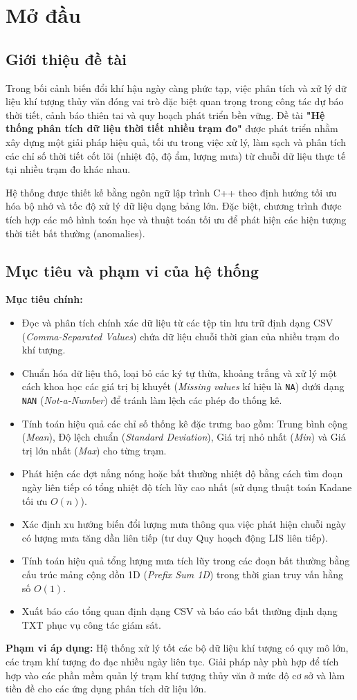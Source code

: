 \section{Mở đầu}
\subsection{Giới thiệu đề tài}
Trong bối cảnh biến đổi khí hậu ngày càng phức tạp, việc phân tích và xử lý dữ liệu khí tượng thủy văn đóng vai trò đặc biệt quan trọng trong công tác dự báo thời tiết, cảnh báo thiên tai và quy hoạch phát triển bền vững. Đề tài \textbf{"Hệ thống phân tích dữ liệu thời tiết nhiều trạm đo"} được phát triển nhằm xây dựng một giải pháp hiệu quả, tối ưu trong việc xử lý, làm sạch và phân tích các chỉ số thời tiết cốt lõi (nhiệt độ, độ ẩm, lượng mưa) từ chuỗi dữ liệu thực tế tại nhiều trạm đo khác nhau.

Hệ thống được thiết kế bằng ngôn ngữ lập trình C++ theo định hướng tối ưu hóa bộ nhớ và tốc độ xử lý dữ liệu dạng bảng lớn. Đặc biệt, chương trình được tích hợp các mô hình toán học và thuật toán tối ưu để phát hiện các hiện tượng thời tiết bất thường (anomalies).

\subsection{Mục tiêu và phạm vi của hệ thống}
\textbf{Mục tiêu chính:}
\begin{itemize}
    \item Đọc và phân tích chính xác dữ liệu từ các tệp tin lưu trữ định dạng CSV (\textit{Comma-Separated Values}) chứa dữ liệu chuỗi thời gian của nhiều trạm đo khí tượng.
    \item Chuẩn hóa dữ liệu thô, loại bỏ các ký tự thừa, khoảng trắng và xử lý một cách khoa học các giá trị bị khuyết (\textit{Missing values} kí hiệu là \texttt{NA}) dưới dạng \texttt{NAN} (\textit{Not-a-Number}) để tránh làm lệch các phép đo thống kê.
    \item Tính toán hiệu quả các chỉ số thống kê đặc trưng bao gồm: Trung bình cộng (\textit{Mean}), Độ lệch chuẩn (\textit{Standard Deviation}), Giá trị nhỏ nhất (\textit{Min}) và Giá trị lớn nhất (\textit{Max}) cho từng trạm.
    \item Phát hiện các đợt nắng nóng hoặc bất thường nhiệt độ bằng cách tìm đoạn ngày liên tiếp có tổng nhiệt độ tích lũy cao nhất (sử dụng thuật toán Kadane tối ưu $O(n)$).
    \item Xác định xu hướng biến đổi lượng mưa thông qua việc phát hiện chuỗi ngày có lượng mưa tăng dần liên tiếp (tư duy Quy hoạch động LIS liên tiếp).
    \item Tính toán hiệu quả tổng lượng mưa tích lũy trong các đoạn bất thường bằng cấu trúc mảng cộng dồn 1D (\textit{Prefix Sum 1D}) trong thời gian truy vấn hằng số $O(1)$.
    \item Xuất báo cáo tổng quan định dạng CSV và báo cáo bất thường định dạng TXT phục vụ công tác giám sát.
\end{itemize}

\textbf{Phạm vi áp dụng:}
Hệ thống xử lý tốt các bộ dữ liệu khí tượng có quy mô lớn, các trạm khí tượng đo đạc nhiều ngày liên tục. Giải pháp này phù hợp để tích hợp vào các phần mềm quản lý trạm khí tượng thủy văn ở mức độ cơ sở và làm tiền đề cho các ứng dụng phân tích dữ liệu lớn.
